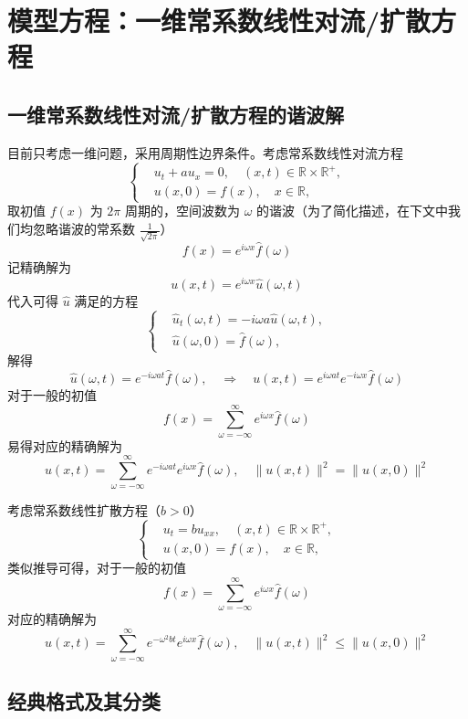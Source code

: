 \chapter{模型方程：一维常系数线性对流/扩散方程}

\section{一维常系数线性对流/扩散方程的谐波解}

目前只考虑一维问题，采用周期性边界条件。考虑常系数线性对流方程
\[
    \left\{
    \begin{aligned}
         & u_t + a u_x = 0, \quad (x,t) \in \mathbb{R} \times \mathbb{R}^+, \\
         & u(x,0) = f(x), \quad x \in \mathbb{R},
    \end{aligned}
    \right.
\]
取初值 $f(x)$ 为 $2\pi$ 周期的，空间波数为 $\omega$ 的谐波（为了简化描述，在下文中我们均忽略谐波的常系数 $\frac{1}{\sqrt{2\pi}}$）
\[
    f(x) = e^{i \omega x} \hat{f}(\omega)
\]
记精确解为
\[
    u(x,t) = e^{i \omega x} \hat{u}(\omega,t)
\]
代入可得 $\hat{u}$ 满足的方程
\[
    \left\{
    \begin{aligned}
         & \hat{u}_t(\omega,t) = -i \omega a \hat{u}(\omega,t), \\
         & \hat{u}(\omega,0) = \hat{f}(\omega),
    \end{aligned}
    \right.
\]
解得
\[
    \hat{u}(\omega,t) = e^{- i \omega a t} \hat{f}(\omega),
    \quad \Rightarrow \quad
    u(x,t) = e^{i \omega a t} e^{- i \omega x} \hat{f}(\omega)
\]
对于一般的初值
\[
    f(x) = \sum_{\omega = -\infty}^{\infty} e^{i \omega x} \hat{f}(\omega)
\]
易得对应的精确解为
\[
    u(x,t) = \sum_{\omega = -\infty}^{\infty} e^{- i \omega a t} e^{i \omega x} \hat{f}(\omega),
    \quad
    \| u(x,t) \|^2 = \|u(x,0)\|^2
\]

考虑常系数线性扩散方程（$b > 0$）
\[
    \left\{
    \begin{aligned}
         & u_t = b u_{xx}, \quad (x,t) \in \mathbb{R} \times \mathbb{R}^+, \\
         & u(x,0) = f(x), \quad x \in \mathbb{R},
    \end{aligned}
    \right.
\]
类似推导可得，对于一般的初值
\[
    f(x) = \sum_{\omega = -\infty}^{\infty} e^{i \omega x} \hat{f}(\omega)
\]
对应的精确解为
\[
    u(x,t) = \sum_{\omega = -\infty}^{\infty} e^{- \omega^2 b t} e^{i \omega x} \hat{f}(\omega),
    \quad
    \| u(x,t) \|^2 \le \|u(x,0)\|^2
\]


\section{经典格式及其分类}

